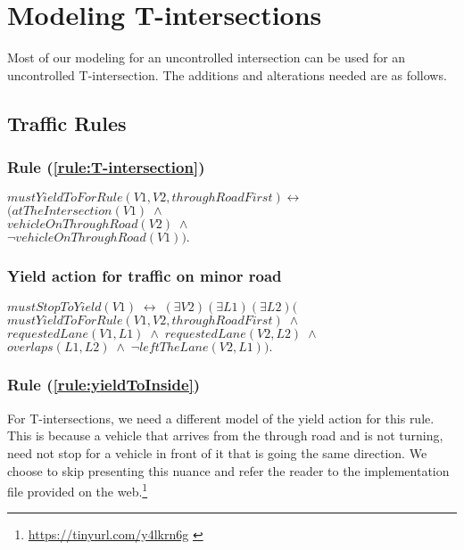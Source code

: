 \section{Modeling T-intersections}
\label{sec:modeling_T-intersection}

Most of our modeling for an uncontrolled intersection
can be used for an uncontrolled T-intersection.
The additions and alterations needed are as follows.

\subsection{Traffic Rules}

\subsubsection{Rule (\ref{rule:T-intersection})}
\begin{center}
    $ mustYieldToForRule(V1, V2, throughRoadFirst) \leftrightarrow $ \\
    $ \Big( atTheIntersection(V1) \; \land $\\
    $ vehicleOnThroughRoad(V2) \; \land $\\
    $ \neg vehicleOnThroughRoad(V1) \Big). $
\end{center}

\subsubsection{Yield action for traffic on minor road}
\begin{center}
    $ mustStopToYield(V1) \; \leftrightarrow \; (\exists V2)(\exists L1)(\exists L2) \Big( $ \\
    $ mustYieldToForRule(V1, V2, throughRoadFirst) \; \land $\\
    $ requestedLane(V1, L1) \; \land \; requestedLane(V2, L2) \; \land $\\
    $ overlaps(L1, L2) \; \land \; \neg leftTheLane(V2, L1) \Big). $
\end{center}

\subsubsection{Rule (\ref{rule:yieldToInside})}
For T-intersections,
we need a different model of the yield action for this rule.
This is because a vehicle that arrives from the through road
and is not turning,
need not stop for a vehicle in front of it that is 
going the same direction.
We choose to skip presenting this nuance and
refer the reader to the implementation file
provided on the web.\footnote{\url{https://tinyurl.com/y4lkrn6g} \label{foot:link}}

